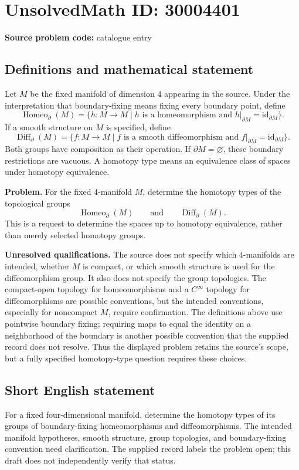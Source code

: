 \documentclass[11pt]{article}
\begin{document}
\section*{UnsolvedMath ID: 30004401}
\textbf{Source problem code:} catalogue entry
\subsection{Definitions and mathematical statement}
Let \(M\) be the fixed manifold of dimension \(4\) appearing in the source. Under the interpretation that boundary-fixing means fixing every boundary point, define
\[
\operatorname{Homeo}_{\partial}(M)
=\{h\colon M\to M\mid h\text{ is a homeomorphism and }h|_{\partial M}=\mathrm{id}_{\partial M}\}.
\]
If a smooth structure on \(M\) is specified, define
\[
\operatorname{Diff}_{\partial}(M)
=\{f\colon M\to M\mid f\text{ is a smooth diffeomorphism and }f|_{\partial M}=\mathrm{id}_{\partial M}\}.
\]
Both groups have composition as their operation. If \(\partial M=\varnothing\), these boundary restrictions are vacuous. A homotopy type means an equivalence class of spaces under homotopy equivalence.

\textbf{Problem.} For the fixed \(4\)-manifold \(M\), determine the homotopy types of the topological groups
\[
\operatorname{Homeo}_{\partial}(M)
\qquad\text{and}\qquad
\operatorname{Diff}_{\partial}(M).
\]
This is a request to determine the spaces up to homotopy equivalence, rather than merely selected homotopy groups.

\textbf{Unresolved qualifications.} The source does not specify which \(4\)-manifolds are intended, whether \(M\) is compact, or which smooth structure is used for the diffeomorphism group. It also does not specify the group topologies. The compact-open topology for homeomorphisms and a \(C^{\infty}\) topology for diffeomorphisms are possible conventions, but the intended conventions, especially for noncompact \(M\), require confirmation. The definitions above use pointwise boundary fixing; requiring maps to equal the identity on a neighborhood of the boundary is another possible convention that the supplied record does not resolve. Thus the displayed problem retains the source's scope, but a fully specified homotopy-type question requires these choices.
\subsection{Short English statement}
For a fixed four-dimensional manifold, determine the homotopy types of its groups of boundary-fixing homeomorphisms and diffeomorphisms. The intended manifold hypotheses, smooth structure, group topologies, and boundary-fixing convention need clarification. The supplied record labels the problem open; this draft does not independently verify that status.
\end{document}

